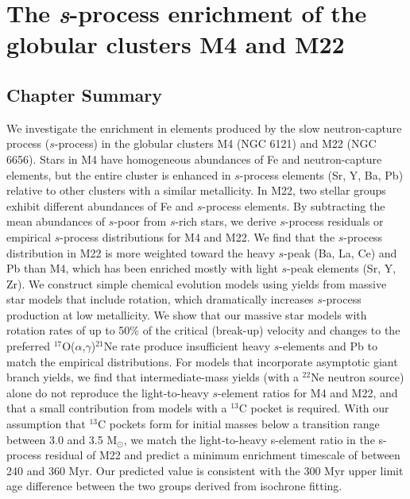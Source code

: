 \chapter{The \textit{s}-process enrichment of the globular clusters M4 and M22}\label{chap:shinglesetal2014}


\section{Chapter Summary}
We investigate the enrichment in elements produced by the slow neutron-capture process ($s$-process) in the globular clusters M4 (NGC 6121) and M22 (NGC 6656). Stars in M4 have homogeneous abundances of Fe and neutron-capture elements, but the entire cluster is enhanced in $s$-process elements (Sr, Y, Ba, Pb) relative to other clusters with a similar metallicity. In M22, two stellar groups exhibit different abundances of Fe and $s$-process elements. By subtracting the mean abundances of $s$-poor from $s$-rich stars, we derive $s$-process residuals or empirical $s$-process distributions for M4 and M22. We find that the $s$-process distribution in M22 is more weighted toward the heavy $s$-peak (Ba, La, Ce) and Pb than M4, which has been enriched mostly with light $s$-peak elements (Sr, Y, Zr). We construct simple chemical evolution models using yields from massive star models that include rotation, which dramatically increases $s$-process production at low metallicity. We show that our massive star models with rotation rates of up to 50\% of the critical (break-up) velocity and changes to the preferred $^{17}$O($\alpha$,$\gamma$)$^{21}$Ne rate produce insufficient heavy $s$-elements and Pb to match the empirical distributions. For models that incorporate asymptotic giant branch yields, we find that intermediate-mass yields (with a $^{22}$Ne neutron source) alone do not reproduce the light-to-heavy $s$-element ratios for M4 and M22, and that a small contribution from models with a $^{13}$C pocket is required. With our assumption that $^{13}$C pockets form for initial masses below a transition range between 3.0 and 3.5 M$_\odot$, we match the light-to-heavy s-element ratio in the s-process residual of M22 and predict a minimum enrichment timescale of between 240 and 360 Myr. Our predicted value is consistent with the 300 Myr upper limit age difference between the two groups derived from isochrone fitting.


